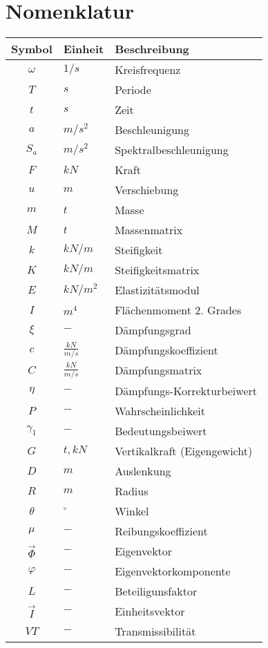 \cleardoublepage
{}
{}

\chapter*{Nomenklatur}

\begin{longtable}{cp{3cm}p{8cm}}
\hline
Symbol       & Einheit & Beschreibung \\
\hline\hline
$\omega$     & $1/s$   & Kreisfrequenz\\
$T$          & $s$     & Periode      \\
$t$          & $s$     & Zeit         \\
$a$          & $m/s^2$ & Beschleunigung \\
$S_a$        & $m/s^2$ & Spektralbeschleunigung \\
$F$          & $kN$    & Kraft        \\
$u$          & $m$     & Verschiebung \\
$m$          & $t$     & Masse        \\
$M$          & $t$     & Massenmatrix \\
$k$          & $kN/m$  & Steifigkeit  \\
$K$          & $kN/m$  & Steifigkeitsmatrix \\
$E$          & $kN/m^2$& Elastizitätsmodul \\
$I$          & $m^4$   & Flächenmoment 2. Grades \\
$\xi$        & $-$     & Dämpfungsgrad     \\
$c$          & $\frac{kN}{m/s}$     & Dämpfungskoeffizient \\
$C$          & $\frac{kN}{m/s}$     & Dämpfungsmatrix \\
$\eta$       & $-$     & Dämpfungs-Korrekturbeiwert \\
$P$          & $-$     & Wahrscheinlichkeit \\
$\gamma_1$   & $-$     & Bedeutungsbeiwert \\
$G$          & $t, kN$ & Vertikalkraft (Eigengewicht) \\
$D$          & $m$     & Auslenkung \\
$R$          & $m$     & Radius \\
$\theta$     & $^{\circ}$ & Winkel \\
$\mu$        & $-$     & Reibungskoeffizient \\
$\vec{\Phi}$ & $-$     & Eigenvektor \\
$\varphi$    & $-$     & Eigenvektorkomponente \\
$L$          & $-$     & Beteiligunsfaktor \\
$\vec{I}$    & $-$     & Einheitsvektor \\
$VT$         & $-$     & Transmissibilität \\
\hline
\end{longtable}


